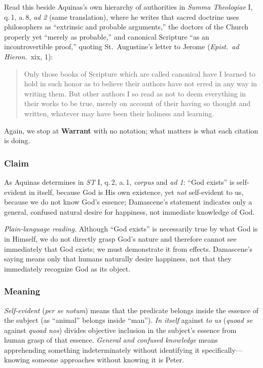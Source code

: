 Read this beside Aquinas's own hierarchy of authorities in \emph{Summa Theologiae} I, q.\,1, a.\,8, \emph{ad 2} (same translation), where he writes that sacred doctrine uses philosophers as ``extrinsic and probable arguments,'' the doctors of the Church properly yet ``merely as probable,'' and canonical Scripture ``as an incontrovertible proof,'' quoting St.\ Augustine's letter to Jerome (\emph{Epist.\ ad Hieron.}\ xix, 1):

\begin{quote}
Only those books of Scripture which are called canonical have I learned to hold in such honor as to believe their authors have not erred in any way in writing them. But other authors I so read as not to deem everything in their works to be true, merely on account of their having so thought and written, whatever may have been their holiness and learning.
\end{quote}

Again, we stop at \textbf{Warrant} with no notation; what matters is what each citation is doing.

\subsubsection*{Claim}
As Aquinas determines in \emph{ST} I, q.\,2, a.\,1, \emph{corpus} and \emph{ad 1}: ``God exists'' is self-evident in itself, because God is His own existence, yet \emph{not} self-evident to us, because we do not know God's essence; Damascene's statement indicates only a general, confused natural desire for happiness, not immediate knowledge of God.

\emph{Plain-language reading.} Although ``God exists'' is necessarily true by what God is in Himself, we do not directly grasp God's nature and therefore cannot see immediately that God exists; we must demonstrate it from effects. Damascene's saying means only that humans naturally desire happiness, not that they immediately recognize God as its object.

\subsubsection*{Meaning}
\emph{Self-evident} (\emph{per se notum}) means that the predicate belongs inside the essence of the subject (as ``animal'' belongs inside ``man''). \emph{In itself} against \emph{to us} (\emph{quoad se} against \emph{quoad nos}) divides objective inclusion in the subject's essence from human grasp of that essence. \emph{General and confused knowledge} means apprehending something indeterminately without identifying it specifically---knowing someone approaches without knowing it is Peter.

